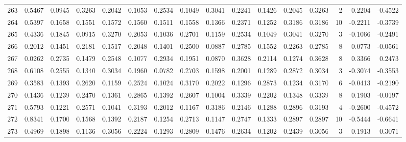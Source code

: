 \begin{tabular}{lrrrrrrrrrrrrrrr}
263 &      0.5467 &  0.0945 &  0.3263 &  0.2042 &  0.1053 &  0.2534 &  0.1049 &  0.3041 &  0.2241 &  0.1426 &   0.2045 &     0.3263 &      2 &                   -0.2204 &                    -0.4522 \\
264 &      0.5397 &  0.1658 &  0.1551 &  0.1572 &  0.1560 &  0.1511 &  0.1558 &  0.1366 &  0.2371 &  0.1252 &   0.3186 &     0.3186 &     10 &                   -0.2211 &                    -0.3739 \\
265 &      0.4336 &  0.1845 &  0.0915 &  0.3270 &  0.2053 &  0.1036 &  0.2701 &  0.1159 &  0.2534 &  0.1049 &   0.3041 &     0.3270 &      3 &                   -0.1066 &                    -0.2491 \\
266 &      0.2012 &  0.1451 &  0.2181 &  0.1517 &  0.2048 &  0.1401 &  0.2500 &  0.0887 &  0.2785 &  0.1552 &   0.2263 &     0.2785 &      8 &                    0.0773 &                    -0.0561 \\
267 &      0.0262 &  0.2735 &  0.1479 &  0.2548 &  0.1077 &  0.2934 &  0.1951 &  0.0870 &  0.3628 &  0.2114 &   0.1274 &     0.3628 &      8 &                    0.3366 &                     0.2473 \\
268 &      0.6108 &  0.2555 &  0.1340 &  0.3034 &  0.1960 &  0.0782 &  0.2703 &  0.1598 &  0.2001 &  0.1289 &   0.2872 &     0.3034 &      3 &                   -0.3074 &                    -0.3553 \\
269 &      0.3583 &  0.1393 &  0.2620 &  0.1159 &  0.2524 &  0.1024 &  0.3170 &  0.2022 &  0.1296 &  0.2873 &   0.1234 &     0.3170 &      6 &                   -0.0413 &                    -0.2190 \\
270 &      0.1436 &  0.1239 &  0.2470 &  0.1361 &  0.2865 &  0.1392 &  0.2607 &  0.1004 &  0.3339 &  0.2202 &   0.1348 &     0.3339 &      8 &                    0.1903 &                    -0.0197 \\
271 &      0.5793 &  0.1221 &  0.2571 &  0.1041 &  0.3193 &  0.2012 &  0.1167 &  0.3186 &  0.2146 &  0.1288 &   0.2896 &     0.3193 &      4 &                   -0.2600 &                    -0.4572 \\
272 &      0.8341 &  0.1700 &  0.1568 &  0.1392 &  0.2187 &  0.1254 &  0.2713 &  0.1147 &  0.2747 &  0.1333 &   0.2897 &     0.2897 &     10 &                   -0.5444 &                    -0.6641 \\
273 &      0.4969 &  0.1898 &  0.1136 &  0.3056 &  0.2224 &  0.1293 &  0.2809 &  0.1476 &  0.2634 &  0.1202 &   0.2439 &     0.3056 &      3 &                   -0.1913 &                    -0.3071 \\

\end{tabular}
